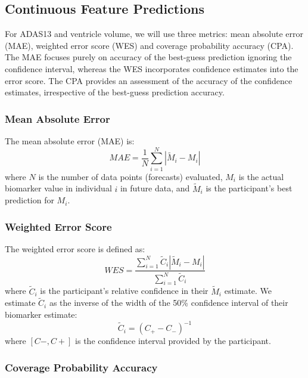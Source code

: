 \subsection{Continuous Feature Predictions}

For ADAS13 and ventricle volume, we will use three metrics: mean absolute error (MAE), weighted error score (WES) and coverage probability accuracy (CPA). The MAE focuses purely on accuracy of the best-guess prediction ignoring the confidence interval, whereas the WES incorporates confidence estimates into the error score. The CPA provides an assessment of the accuracy of the confidence estimates, irrespective of the best-guess prediction accuracy.


\subsubsection{Mean Absolute Error}

The mean absolute error (MAE) is:
\begin{equation}
 MAE = \frac{1}{N}\sum_{i=1}^{N}\left|{\tilde{M}_i-M_i}\right|
\end{equation}
where $N$ is the number of data points (forecasts) evaluated, $M_i$ is the actual biomarker value in individual $i$ in future data, and $\tilde{M}_i$ is the participant's best prediction for $M_i$.

\subsubsection{Weighted Error Score}

The weighted error score is defined as:
\begin{equation}
 WES=\frac{\sum_{i=1}^{N}\tilde{C}_i\left|\tilde{M}_i-M_i\right|}{\sum_{i=1}^{N}\tilde{C}_i}
\end{equation}
where $\tilde{C}_i$ is the participant's relative confidence in their $\tilde{M}_i$ estimate. We estimate $\tilde{C}_i$ as the inverse of the width of the 50\% confidence interval of their biomarker estimate:
\begin{equation}
\tilde{C}_i=\left(C_+-C_-\right)^{-1}
\end{equation}
where $[C-, C+]$ is the confidence interval provided by the participant.

\subsubsection{Coverage Probability Accuracy}

